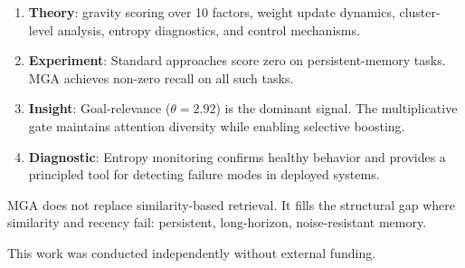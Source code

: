 \documentclass{article}
\begin{document}
\begin{enumerate}[leftmargin=2em,itemsep=2pt]
\item \textbf{Theory}: gravity scoring over 10 factors, weight update dynamics, cluster-level analysis, entropy diagnostics, and control mechanisms.
\item \textbf{Experiment}: Standard approaches score zero on persistent-memory tasks. MGA achieves non-zero recall on all such tasks.
\item \textbf{Insight}: Goal-relevance ($\theta = 2.92$) is the dominant signal. The multiplicative gate maintains attention diversity while enabling selective boosting.
\item \textbf{Diagnostic}: Entropy monitoring confirms healthy behavior and provides a principled tool for detecting failure modes in deployed systems.
\end{enumerate}

MGA does not replace similarity-based retrieval. It fills the structural gap where similarity and recency fail: persistent, long-horizon, noise-resistant memory.

\begin{ack}
This work was conducted independently without external funding.
\end{ack}



\end{document}

